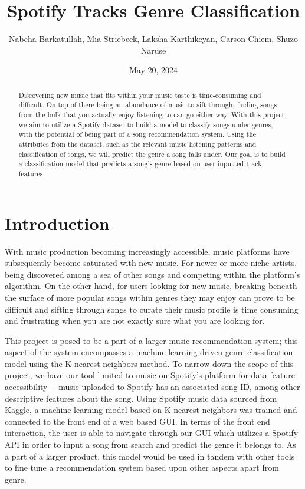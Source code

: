 \documentclass[times, twocolumn]{article}
\title{Spotify Tracks Genre Classification}
\author{Nabeha Barkatullah, Mia Striebeck, Laksha Karthikeyan, Carson Chiem, Shuzo Naruse}
\date{May 20, 2024}
\begin{document}
\maketitle

\newpage
\begin{abstract}
Discovering new music that fits within your music taste is time-consuming and difficult. On top of there being an abundance of music to sift through, finding songs from the bulk that you actually enjoy listening to can go either way. With this project, we aim to utilize a Spotify dataset to build a model to classify songs under genres, with the potential of being part of a song recommendation system. Using the attributes from the dataset, such as the relevant music listening patterns and classification of songs, we will predict the genre a song falls under. Our goal is to build a classification model that predicts a song’s genre based on user-inputted track features.
\end{abstract}
\section{Introduction}
With music production becoming increasingly accessible, music platforms have subsequently become saturated with new music. For newer or more niche artists, being discovered among a sea of other songs and competing within the platform’s algorithm. On the other hand, for users looking for new music, breaking beneath the surface of more popular songs within genres they may enjoy can prove to be difficult and sifting through songs to curate their music profile is time consuming and frustrating when you are not exactly sure what you are looking for. 

This project is posed to be a part of a larger music recommendation system; this aspect of the system encompasses a machine learning driven genre classification model using the K-nearest neighbors method. To narrow down the scope of this project, we have our tool limited to music on Spotify’s platform for data feature accessibility— music uploaded to Spotify has an associated song ID, among other descriptive features about the song. Using Spotify music data sourced from Kaggle, a machine learning model based on K-nearest neighbors was trained and connected to the front end of a web based GUI.  In terms of the front end interaction, the user is able to navigate through our GUI which utilizes a Spotify API in order to input a song from search and predict the genre it belongs to. As a part of a larger product, this model would be used in tandem with other tools to fine tune a recommendation system based upon other aspects apart from genre. 
\end{document}
